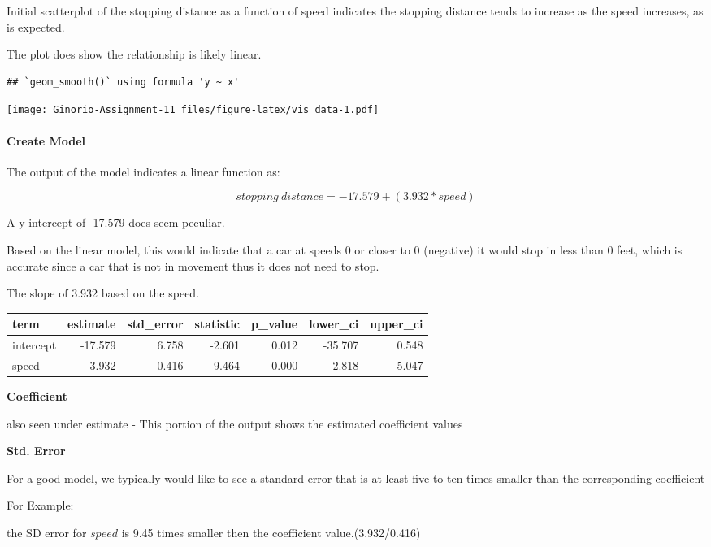 \documentclass[
]{article}
\begin{document}
Initial scatterplot of the stopping distance as a function of speed
indicates the stopping distance tends to increase as the speed
increases, as is expected.

The plot does show the relationship is likely linear.

\begin{verbatim}
## `geom_smooth()` using formula 'y ~ x'
\end{verbatim}

\texttt{[image: Ginorio-Assignment-11\_files/figure-latex/vis data-1.pdf]}

\hypertarget{create-model}{%
\paragraph{Create Model}\label{create-model}}

The output of the model indicates a linear function as:

\[
stopping\ distance = -17.579 + (3.932 * speed)
\]

A y-intercept of -17.579 does seem peculiar.

Based on the linear model, this would indicate that a car at speeds 0 or
closer to 0 (negative) it would stop in less than 0 feet, which is
accurate since a car that is not in movement thus it does not need to
stop.

The slope of 3.932 based on the speed.

\begin{longtable}[]{@{}lrrrrrr@{}}
\toprule
term & estimate & std\_error & statistic & p\_value & lower\_ci &
upper\_ci \\
\midrule
\endhead
intercept & -17.579 & 6.758 & -2.601 & 0.012 & -35.707 & 0.548 \\
speed & 3.932 & 0.416 & 9.464 & 0.000 & 2.818 & 5.047 \\
\bottomrule
\end{longtable}

\textbf{Coefficient}

also seen under estimate - This portion of the output shows the
estimated coefficient values

\textbf{Std. Error}

For a good model, we typically would like to see a standard error that
is at least five to ten times smaller than the corresponding coefficient

For Example:

the SD error for \(speed\) is 9.45 times smaller then the coefficient
value.(3.932/0.416)
\end{document}
